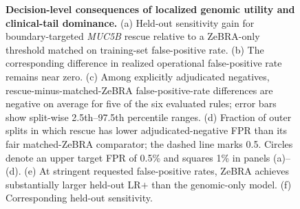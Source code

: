 {\begin{figure}[!t]
\caption{\textbf{Decision-level consequences of localized genomic utility and clinical-tail dominance.} (a) Held-out sensitivity gain for boundary-targeted \textit{MUC5B} rescue relative to a ZeBRA-only threshold matched on training-set false-positive rate. (b) The corresponding difference in realized operational false-positive rate remains near zero. (c) Among explicitly adjudicated negatives, rescue-minus-matched-ZeBRA false-positive-rate differences are negative on average for five of the six evaluated rules; error bars show split-wise 2.5th--97.5th percentile ranges. (d) Fraction of outer splits in which rescue has lower adjudicated-negative FPR than its fair matched-ZeBRA comparator; the dashed line marks 0.5. Circles denote an upper target FPR of 0.5\% and squares 1\% in panels (a)--(d). (e) At stringent requested false-positive rates, ZeBRA achieves substantially larger held-out LR$+$ than the genomic-only model. (f) Corresponding held-out sensitivity.}
\label{fig:decision-consequences}
\end{figure}%
}
